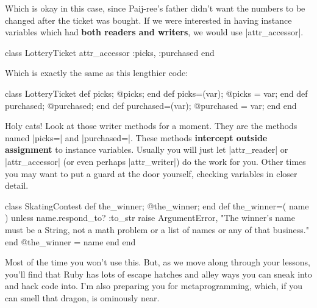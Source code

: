 \documentclass[12pt,twoside]{report}
\begin{document}
Which is okay in this case, since Paij-ree's father didn't want the
numbers to be changed after the ticket was bought.  If we were
interested in having instance variables which had {\bf both readers
  and writers}, we would use
\rubyinline|attr_accessor|.


\begin{rubycode}

 class LotteryTicket
   attr_accessor :picks, :purchased
 end

\end{rubycode}


Which is exactly the same as this lengthier code:


\begin{rubycode}

 class LotteryTicket
   def picks;           @picks;            end
   def picks=(var);     @picks = var;      end
   def purchased;       @purchased;        end
   def purchased=(var); @purchased = var;  end
 end

\end{rubycode}


Holy cats!  Look at those writer methods for a moment.  They are the
methods named \rubyinline|picks=| and
\rubyinline|purchased=|.  These methods {\bf intercept
  outside assignment} to instance variables. Usually you will just let
\rubyinline|attr_reader| or
\rubyinline|attr_accessor| (or even perhaps
\rubyinline|attr_writer|) do the work for you. Other
times you may want to put a guard at the door yourself, checking
variables in closer detail.


\begin{rubycode}

 class SkatingContest
   def the_winner; @the_winner; end
   def the_winner=( name )
     unless name.respond_to? :to_str
       raise ArgumentError, "The winner's name must be a String,
         not a math problem or a list of names or any of that business."
     end
     @the_winner = name
   end
 end

\end{rubycode}


Most of the time you won't use this.  But, as we move along through
your lessons, you'll find that Ruby has lots of escape hatches and
alley ways you can sneak into and hack code into.  I'm also preparing
you for metaprogramming, which, if you can smell that dragon, is
ominously near.  
\end{document}
